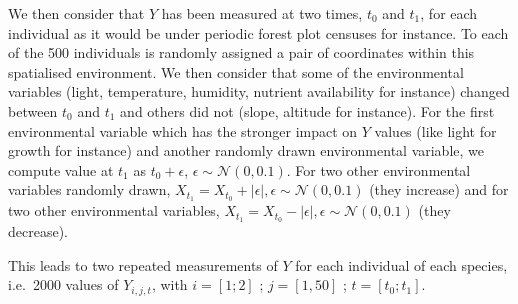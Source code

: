 \documentclass[
]{article}
\begin{document}
We then consider that \(Y\) has been measured at two times, \(t_0\) and
\(t_1\), for each individual as it would be under periodic forest plot
censuses for instance. To each of the 500 individuals is randomly
assigned a pair of coordinates within this spatialised environment. We
then consider that some of the environmental variables (light,
temperature, humidity, nutrient availability for instance) changed
between \(t_0\) and \(t_1\) and others did not (slope, altitude for
instance). For the first environmental variable which has the stronger
impact on \(Y\) values (like light for growth for instance) and another
randomly drawn environmental variable, we compute value at \(t_1\) as
\(t_0 + \epsilon\), \(\epsilon \sim \mathcal{N}(0, 0.1)\). For two other
environmental variables randomly drawn,
\(X_{t_1} = X_{t_0} + |\epsilon|, \epsilon \sim \mathcal{N}(0, 0.1)\)
(they increase) and for two other environmental variables,
\(X_{t_1} = X_{t_0} - |\epsilon|, \epsilon \sim \mathcal{N}(0, 0.1)\)
(they decrease).

This leads to two repeated measurements of \(Y\) for each individual of
each species, i.e.~2000 values of \(Y_{i,j,t}\), with \(i=[1;2]\) ;
\(j=[1,50]\) ; \(t=[t_0;t_1]\).
\end{document}
